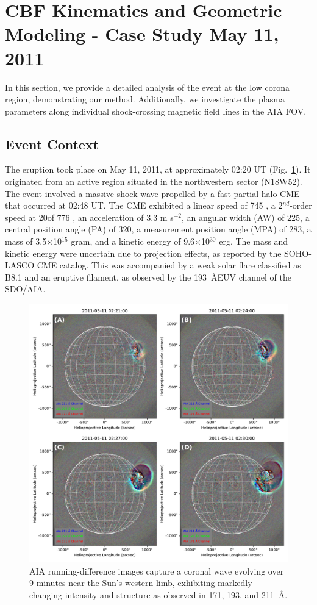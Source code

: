 \section{CBF Kinematics and Geometric Modeling - Case Study May 11, 2011}
In this section, we provide a detailed analysis of the event at the low corona region, demonstrating our method. Additionally, we investigate the plasma parameters along individual shock-crossing magnetic field lines in the AIA FOV.

\subsection{Event Context}
The eruption took place on May 11, 2011, at approximately 02:20 UT (Fig.~\ref{fig_aia_event}). It originated from an active region situated in the northwestern sector (N18W52). The event involved a massive shock wave propelled by a fast partial-halo CME that occurred at 02:48 UT. The CME exhibited a linear speed of 745 \kms, a 2$^{nd}$-order speed at 20\rsun of 776 \kms, an acceleration of 3.3 m s$^{-2}$, an angular width (AW) of 225\degree, a central position angle (PA) of 320\degree, a measurement position angle (MPA) of 283\degree, a mass of 3.5$\times$10$^{15}$ gram, and a kinetic energy of 9.6$\times$10$^{30}$ erg. The mass and kinetic energy were uncertain due to projection effects, as reported by the SOHO-LASCO CME catalog. This was accompanied by a weak solar flare classified as B8.1 and an eruptive filament, as observed by the 193~\AA EUV channel of the SDO/AIA.

\begin{figure}[!htp] %
	\centerline{\includegraphics[width=0.8\columnwidth]{chapter2/figs/RGB_panel.pdf}}
	\caption{AIA running-difference images capture a coronal wave evolving over 9 minutes near the Sun's western limb, exhibiting markedly changing intensity and structure as observed in 171, 193, and 211~\AA.}
	\label{fig_aia_event}
\end{figure}

